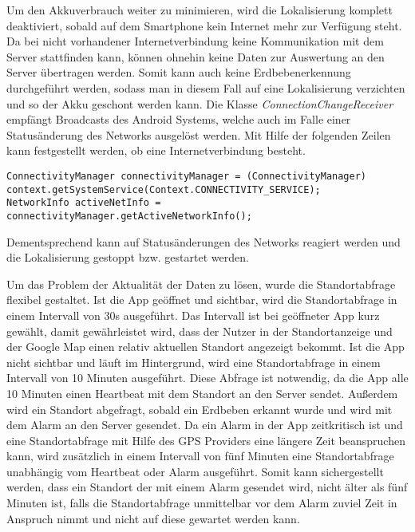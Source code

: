\par\bigskip
Um den Akkuverbrauch weiter zu minimieren, wird die Lokalisierung komplett deaktiviert, sobald auf dem Smartphone kein Internet mehr zur Verfügung steht. Da bei nicht vorhandener Internetverbindung keine Kommunikation mit dem Server stattfinden kann, können ohnehin keine Daten zur Auswertung an den Server übertragen werden. Somit kann auch keine Erdbebenerkennung durchgeführt werden, sodass man in diesem Fall auf eine Lokalisierung verzichten und so der Akku geschont werden kann.
Die Klasse \textit{ConnectionChangeReceiver} empfängt Broadcasts des Android Systems, welche auch im Falle einer Statusänderung des Networks ausgelöst werden. Mit Hilfe der folgenden Zeilen kann festgestellt werden, ob eine Internetverbindung besteht.
\begin{lstlisting}[caption={ConnectionChangeReceiver},label=lst:networkInfo, basicstyle=\small]
ConnectivityManager connectivityManager = (ConnectivityManager) context.getSystemService(Context.CONNECTIVITY_SERVICE);
NetworkInfo activeNetInfo = connectivityManager.getActiveNetworkInfo();
\end{lstlisting}
Dementsprechend kann auf Statusänderungen des Networks reagiert werden und die Lokalisierung gestoppt bzw. gestartet werden.
\par\medskip
Um das Problem der Aktualität der Daten zu lösen, wurde die Standortabfrage flexibel gestaltet. Ist die App geöffnet und sichtbar, wird die Standortabfrage in einem Intervall von 30s ausgeführt. Das Intervall ist bei geöffneter App kurz gewählt, damit gewährleistet wird, dass der Nutzer in der Standortanzeige und der Google Map einen relativ aktuellen Standort angezeigt bekommt. Ist die App nicht sichtbar und läuft im Hintergrund, wird eine Standortabfrage in einem Intervall von 10 Minuten ausgeführt. Diese Abfrage ist notwendig, da die App alle 10 Minuten einen Heartbeat mit dem Standort an den Server sendet. Außerdem wird ein Standort abgefragt, sobald ein Erdbeben erkannt wurde und wird mit dem Alarm an den Server gesendet. Da ein Alarm in der App zeitkritisch ist und eine Standortabfrage mit Hilfe des GPS Providers eine längere Zeit beanspruchen kann, wird zusätzlich in einem Intervall von fünf Minuten eine Standortabfrage unabhängig vom Heartbeat oder Alarm ausgeführt. Somit kann sichergestellt werden, dass ein Standort der mit einem Alarm gesendet wird, nicht älter als fünf Minuten ist, falls die Standortabfrage unmittelbar vor dem Alarm zuviel Zeit in Anspruch nimmt und nicht auf diese gewartet werden kann.

